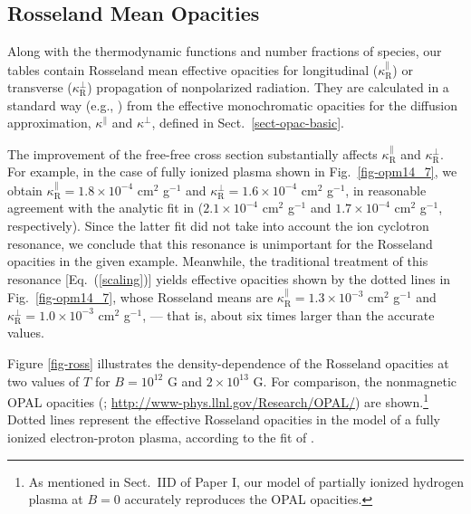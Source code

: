 \documentclass{emulateapj}
\newcommand{\req}[1]{Eq.\ (\ref{#1})}
\begin{document}
      \subsection{Rosseland Mean Opacities}
%
Along with the thermodynamic functions
and number fractions of species, our tables contain 
Rosseland mean effective opacities for longitudinal
($\kappa_\mathrm{R}^\|$) or transverse ($\kappa_\mathrm{R}^\perp$) 
propagation of nonpolarized radiation. They are calculated
in a standard way (e.g., \citealp{Armstrong})
from the effective monochromatic opacities 
for the diffusion approximation,
$\kappa^\|$ and $\kappa^\perp$, defined in Sect.\ \ref{sect-opac-basic}.

The improvement of the free-free cross section  
substantially affects $\kappa_\mathrm{R}^\|$
and $\kappa_\mathrm{R}^\perp$.
For example, in the case of fully ionized plasma shown in 
Fig.\ \ref{fig-opm14_7}, 
we obtain $\kappa_\mathrm{R}^\|=1.8\times10^{-4}$ cm$^2$ g$^{-1}$
and $\kappa_\mathrm{R}^\perp=1.6\times10^{-4}$ cm$^2$ g$^{-1}$,
in reasonable agreement with the analytic fit 
in \citet{PY01} 
($2.1\times10^{-4}$ cm$^2$ g$^{-1}$ and
 $1.7\times10^{-4}$ cm$^2$ g$^{-1}$, respectively).
Since the latter fit did not take into account the ion cyclotron 
resonance, we conclude that this resonance is unimportant 
for the Rosseland opacities in the given example. 
Meanwhile, the traditional treatment
of this resonance [\req{scaling}] yields effective 
opacities shown by the dotted lines in Fig.\ \ref{fig-opm14_7},
whose Rosseland means are 
$\kappa_\mathrm{R}^\|=1.3\times10^{-3}$ cm$^2$ g$^{-1}$
and $\kappa_\mathrm{R}^\perp=1.0\times10^{-3}$ cm$^2$ g$^{-1}$,
--- that is, about six times larger than the accurate values.

Figure \ref{fig-ross} illustrates the density-dependence
of the Rosseland opacities at two values of $T$
for $B=10^{12}$ G and $2\times10^{13}$ G.
For comparison, the nonmagnetic OPAL opacities
(\citealp{OPAL};
\url{http://www-phys.llnl.gov/Research/OPAL/}) are shown.\footnote{%
As mentioned in Sect.\ IID of Paper I,
our model of partially ionized hydrogen plasma
at $B=0$ accurately reproduces the OPAL opacities.}
Dotted lines represent the effective Rosseland opacities
in the model of a fully ionized electron-proton plasma,
according to the fit of \citet{PY01}.
\end{document}
